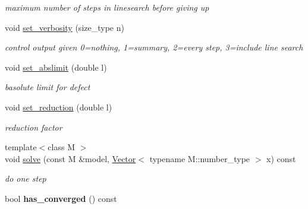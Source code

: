 \begin{DoxyCompactItemize}
\begin{DoxyCompactList}\small\item\em maximum number of steps in linesearch before giving up \item\end{DoxyCompactList}\item 
\hypertarget{classhdnum_1_1Banach_a69eff1faff663dbc479155bc56836545}{
void \hyperlink{classhdnum_1_1Banach_a69eff1faff663dbc479155bc56836545}{set\_\-verbosity} (size\_\-type n)}
\label{classhdnum_1_1Banach_a69eff1faff663dbc479155bc56836545}

\begin{DoxyCompactList}\small\item\em control output given 0=nothing, 1=summary, 2=every step, 3=include line search \item\end{DoxyCompactList}\item 
\hypertarget{classhdnum_1_1Banach_a5d84204834e3d65b7976bcc21d0a7009}{
void \hyperlink{classhdnum_1_1Banach_a5d84204834e3d65b7976bcc21d0a7009}{set\_\-abslimit} (double l)}
\label{classhdnum_1_1Banach_a5d84204834e3d65b7976bcc21d0a7009}

\begin{DoxyCompactList}\small\item\em basolute limit for defect \item\end{DoxyCompactList}\item 
\hypertarget{classhdnum_1_1Banach_adc7268cb87533d95f8947ab32d195fc3}{
void \hyperlink{classhdnum_1_1Banach_adc7268cb87533d95f8947ab32d195fc3}{set\_\-reduction} (double l)}
\label{classhdnum_1_1Banach_adc7268cb87533d95f8947ab32d195fc3}

\begin{DoxyCompactList}\small\item\em reduction factor \item\end{DoxyCompactList}\item 
\hypertarget{classhdnum_1_1Banach_af3cf8e128e03a82fd5a178abb6dfda6e}{
{\footnotesize template$<$class M $>$ }\\void \hyperlink{classhdnum_1_1Banach_af3cf8e128e03a82fd5a178abb6dfda6e}{solve} (const M \&model, \hyperlink{classhdnum_1_1Vector}{Vector}$<$ typename M::number\_\-type $>$ x) const }
\label{classhdnum_1_1Banach_af3cf8e128e03a82fd5a178abb6dfda6e}

\begin{DoxyCompactList}\small\item\em do one step \item\end{DoxyCompactList}\item 
\hypertarget{classhdnum_1_1Banach_aef74a54b1d47ff520a9a68757e3a9f4b}{
bool {\bfseries has\_\-converged} () const }
\label{classhdnum_1_1Banach_aef74a54b1d47ff520a9a68757e3a9f4b}

\end{DoxyCompactItemize}


